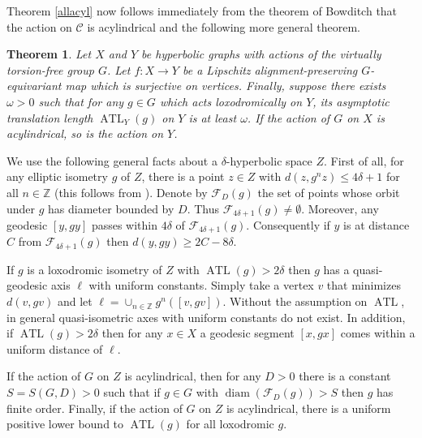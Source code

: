 \documentclass[11pt]{article}
\newtheorem{thm}{Theorem}[section]
\theoremstyle{remark}
\def\Z{{\mathbb Z}}
\def\diam{\operatorname{diam}}
\def\C{{\mathcal C}}
\newcommand{\ATL}{\operatorname{ATL}}
\begin{document}
Theorem \ref{allacyl} now follows immediately from the theorem of
Bowditch \cite{bowditch:tight} that the action on $\C$ is acylindrical and the following more general theorem.
\begin{thm}
  \label{generalacyl}
  Let $X$ and $Y$ be hyperbolic graphs with actions of the virtually torsion-free group $G$.
  Let $f:X\to Y$ be a Lipschitz alignment-preserving $G$-equivariant
  map which is surjective on vertices.
  Finally, suppose there exists $\omega>0$ such that for any
  $g\in G$ which acts loxodromically on $Y$, its asymptotic
  translation length $\ATL_Y(g)$ on
  $Y$ is at least $\omega$. If the action of $G$ on $X$ is acylindrical, so is the action
  on $Y$.
\end{thm}

We use the following general facts about a $\delta$-hyperbolic space $Z$.
First of all, for any elliptic isometry $g$ of $Z$,
there is a point $z\in Z$ with $d(z,g^nz)\leq 4\delta + 1$
for all $n\in \Z$ (this follows from \cite[Lemma 7.3]{Hull}).
Denote by
$\mathcal{F}_D(g)$ the set of points whose orbit under $g$ has diameter
bounded by $D$. Thus $\mathcal{F}_{4\delta+1}(g)\neq \emptyset$. Moreover,
any geodesic $[y,gy]$ passes within $4\delta$ of $\mathcal{F}_{4\delta+1}(g)$.
Consequently if $y$ is at distance $C$ from $\mathcal{F}_{4\delta+1}(g)$ then
$d(y, gy)\geq 2C-8\delta$.

If $g$ is a loxodromic isometry of $Z$ with $\ATL(g)>2\delta$ then $g$
has a quasi-geodesic axis $\ell$ with uniform constants. Simply take a vertex
$v$ that minimizes $d(v,gv)$ and let $\ell=\cup_{n\in \Z}
g^n([v,gv])$. Without the assumption on $\ATL$, in general
quasi-isometric axes with uniform constants do not exist.
In addition, if $\ATL(g)>2\delta$ then for any $x\in X$ a geodesic
segment $[x,gx]$ comes within a uniform distance of $\ell$.

If the action of $G$ on $Z$ is acylindrical,
then for any $D>0$ there is a constant $S=S(G,D)>0$ such that if
$g\in G$ with
$\diam(\mathcal{F}_D(g))>S$ then $g$ has finite order. Finally, if the
action of $G$ on $Z$ is acylindrical, there is a uniform positive
lower bound to $\ATL(g)$ for all loxodromic $g$.
\end{document}
